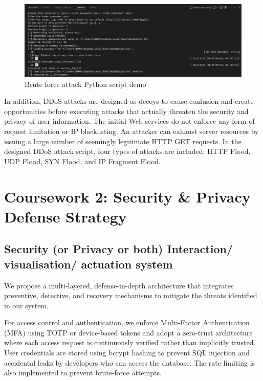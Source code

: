 \documentclass{article}
\begin{document}
\begin{figure}[htb]
    \centering
    \includegraphics[width=1\textwidth]{images/Brute_force_attack_Python_script_demo.png}
    \caption{Brute force attack Python script demo}
    \label{fig:brute_force_attack}
\end{figure}

In addition, DDoS attacks are designed as decoys to cause confusion and create opportunities before executing attacks that actually threaten the security and privacy of user information. The initial Web services do not enforce any form of request limitation or IP blacklisting. An attacker can exhaust server resources by issuing a large number of seemingly legitimate HTTP GET requests. In the designed DDoS attack script, four types of attacks are included: HTTP Flood, UDP Flood, SYN Flood, and IP Fragment Flood.








\section{Coursework 2: Security \& Privacy Defense Strategy}
\subsection{Security (or Privacy or both) Interaction/ visualisation/ actuation system}
We propose a multi-layered, defense-in-depth architecture that integrates preventive, detective, and recovery mechanisms to mitigate the threats identified in our system.

For access control and authentication, we enforce Multi-Factor Authentication (MFA) using TOTP or device-based tokens and adopt a zero-trust architecture where each access request is continuously verified rather than implicitly trusted. User credentials are stored using bcrypt hashing to prevent SQL injection and accidental leaks by developers who can access the database. The rate limiting is also implemented to prevent brute-force attempts.
\end{document}
